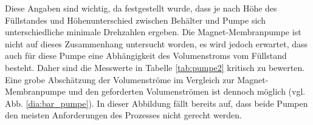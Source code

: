 \FloatBarrier
\vspace*{-5mm}
Diese Angaben sind wichtig, da festgestellt wurde, dass je nach Höhe des Füllstandes und Höhenunterschied zwischen Behälter und Pumpe sich unterschiedliche minimale Drehzahlen ergeben. Die Magnet-Membranpumpe ist nicht auf dieses Zusammenhang untersucht worden, es wird jedoch erwartet, dass auch für diese Pumpe eine Abhängigkeit des Volumenstroms vom Füllstand besteht. Daher sind die Messwerte in Tabelle \ref{tab:pumpe2} kritisch zu bewerten. Eine grobe Abschätzung der Volumenströme im Vergleich zur Magnet-Membranpumpe und den geforderten Volumenströmen ist dennoch möglich (vgl. Abb. \ref{dia:bar_pumpe}). In dieser Abbildung fällt bereits auf, dass beide Pumpen den meisten Anforderungen des Prozesses nicht gerecht werden.
\vspace*{-5mm}
\begin{table}[h!]
	\renewcommand*{\arraystretch}{1.2}
	\centering
	\caption{Minimale Volumenströme der Zahnradpumpe}
	\label{tab:pumpe2}
\end{table}%
\FloatBarrier 

